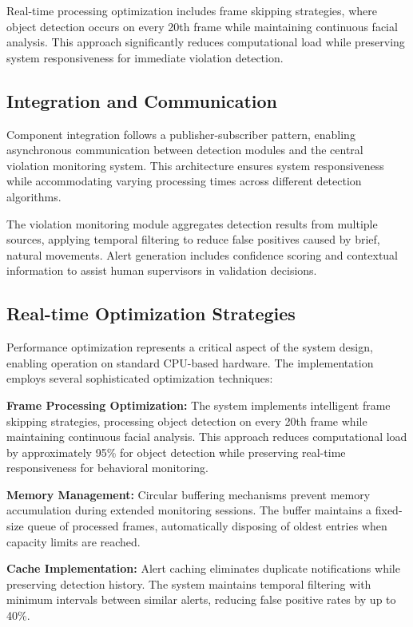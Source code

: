 \documentclass[conference]{IEEEtran}
\begin{document}
Real-time processing optimization includes frame skipping strategies, where object detection occurs on every 20th frame while maintaining continuous facial analysis. This approach significantly reduces computational load while preserving system responsiveness for immediate violation detection.

\subsection{Integration and Communication}

Component integration follows a publisher-subscriber pattern, enabling asynchronous communication between detection modules and the central violation monitoring system. This architecture ensures system responsiveness while accommodating varying processing times across different detection algorithms.

The violation monitoring module aggregates detection results from multiple sources, applying temporal filtering to reduce false positives caused by brief, natural movements. Alert generation includes confidence scoring and contextual information to assist human supervisors in validation decisions.

\subsection{Real-time Optimization Strategies}

Performance optimization represents a critical aspect of the system design, enabling operation on standard CPU-based hardware. The implementation employs several sophisticated optimization techniques:

\textbf{Frame Processing Optimization:} The system implements intelligent frame skipping strategies, processing object detection on every 20th frame while maintaining continuous facial analysis. This approach reduces computational load by approximately 95\% for object detection while preserving real-time responsiveness for behavioral monitoring.

\textbf{Memory Management:} Circular buffering mechanisms prevent memory accumulation during extended monitoring sessions. The buffer maintains a fixed-size queue of processed frames, automatically disposing of oldest entries when capacity limits are reached.

\textbf{Cache Implementation:} Alert caching eliminates duplicate notifications while preserving detection history. The system maintains temporal filtering with minimum intervals between similar alerts, reducing false positive rates by up to 40\%.
\end{document}
